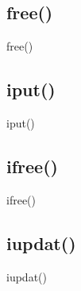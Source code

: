 \documentclass{beamer}
\begin{document}


\subsection{free()}

\begin{frame}{free()}
\end{frame}




\subsection{iput()}

\begin{frame}{iput()}
\end{frame}




\subsection{ifree()}

\begin{frame}{ifree()}
\end{frame}




\subsection{iupdat()}

\begin{frame}{iupdat()}
\end{frame}
\end{document}
